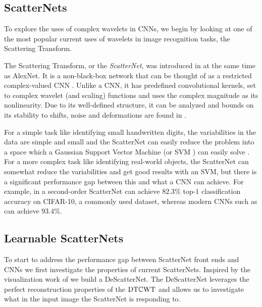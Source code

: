 \subsection{ScatterNets}
To explore the uses of complex wavelets in CNNs, we begin by looking at one of the most
popular current uses of wavelets in image recognition tasks, the
Scattering Transform.

The Scattering Transform, or the \emph{ScatterNet}, was introduced in \cite{mallat_group_2012,
bruna_invariant_2013} at the same time as AlexNet. It is a non-black-box
network that can be thought of as a restricted complex-valued CNN
\cite{bruna_mathematical_2015}. Unlike a CNN, it has predefined
convolutional kernels, set to complex wavelet (and scaling) functions and uses
the complex magnitude as its nonlinearity. Due to
its well-defined structure, it can be analyzed and bounds on its stability to
shifts, noise and deformations are found in \cite{mallat_group_2012}.
%

For a simple task like identifying small handwritten digits,
the variabilities in the data are simple and small and the ScatterNet can easily
reduce the problem into a space which a Gaussian Support Vector Machine (or SVM
\cite{cortes_support-vector_1995}) can easily solve
\cite{bruna_invariant_2013}. For a more complex task like identifying real-world
objects, the ScatterNet can somewhat reduce the variabilities and get good
results with an SVM, but there is a significant performance gap between this and
what a CNN can achieve. For example, in \cite{oyallon_deep_2015} a second-order
ScatterNet can achieve $82.3\%$ top-1 classification accuracy on CIFAR-10, a
commonly used dataset, whereas modern CNNs such as \cite{he_deep_2016} can
achieve $93.4\%$.

\subsection{Learnable ScatterNets}
To start to address the performance gap between ScatterNet front ends and CNNs
we first investigate the properties of current ScatterNets. Inspired by the
visualization work of \citeauthor{zeiler_visualizing_2014}
\cite{zeiler_visualizing_2014} we build a DeScatterNet. The DeScatterNet
leverages the perfect reconstruction properties of the $\mathrm{DT}\mathbb{C}\mathrm{WT}$ and allows us to
investigate what in the input image the ScatterNet is responding to.

